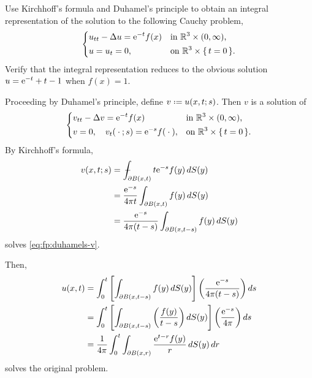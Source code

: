 \begin{problem}
  Use Kirchhoff's formula and Duhamel's principle to obtain an integral
  representation of the solution to the following Cauchy problem,
  \[
    \left\{
      \begin{aligned}
        &u_{tt}-\Delta u=\mathrm{e}^{-t}f(x)&&\text{in \(\mathbb{R}^3\times(0,\infty)\),}\\
        &u=u_t=0,&&\text{on \(\mathbb{R}^3\times\{\,t=0\,\}\).}
      \end{aligned}
    \right.
  \]
  Verify that the integral representation reduces to the obvious solution
  \(u=\mathrm{e}^{-t}+t-1\) when \(f(x)=1\).
\end{problem}
\begin{solution*}
  Proceeding by Duhamel's principle, define \(v\defeq u(x,t;s)\). Then
  \(v\) is a solution of
  \begin{equation}
    \label{eq:fp:duhamels-v}
    \left\{
      \begin{aligned}
        &v_{tt}-\Lap v=\rme^{-t}f(x)%
        &&\text{in \(\R^3\times(0,\infty)\),}\\
        &v=0, \quad v_t(\blank;s)=\rme^{-s}f(\blank),%
        &&\text{on \(\R^3\times\{\,t=0\,\}\).}
      \end{aligned}
    \right.
  \end{equation}
  By Kirchhoff's formula,
  \begin{align*}
    v(x,t;s)
    &=\fint_{\partial B(x,t)} t\rme^{-s}f(y)\diff S(y)\\
    &=\frac{\rme^{-s}}{4\pi t}\int_{\partial B(x,t)} f(y)\diff S(y)\\
    &=\frac{\rme^{-s}}{4\pi(t-s)}\int_{\partial B(x,t-s)}f(y)\diff S(y)
  \end{align*}
  solves \eqref{eq:fp:duhamels-v}.

  Then,
  \begin{equation}
    \label{eq:fp:duhamels-sol}
    \begin{aligned}
      u(x,t) &=\int_0^t \left[ \int_{\partial B(x,t-s)}f(y)\diff S(y)
      \right]%
      \left(\frac{\rme^{-s}}{4\pi(t-s)}\right)\diff s\\
      &=\int_0^t \left[%
        \int_{\partial B(x,t-s)}%
        \left(%
          \frac{f(y)}{t-s}%
        \right)%
        \diff S(y) \right]%
      \left(\frac{\rme^{-s}}{4\pi}\right)\diff s\\
      &=\frac{1}{4\pi} \int_0^t\int_{\partial
        B(x,r)}\frac{\rme^{t-r}f(y)}{r}\diff S(y)\diff r
    \end{aligned}
  \end{equation}
  solves the original problem.


\end{solution*}
